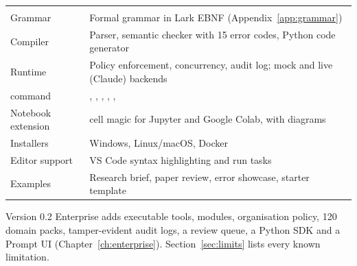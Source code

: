 \begin{center}
\small
\begin{tabularx}{\linewidth}{@{}L{4.2cm}Y@{}}
\toprule
{} & \\
\goldrule
Grammar & Formal grammar in Lark EBNF (Appendix~\ref{app:grammar})\\
Compiler  & Parser, semantic checker with 15 error codes, Python code generator\\
Runtime  & Policy enforcement, concurrency, audit log; mock and live (Claude) backends\\
 command & , , , , , \\
Notebook extension &  cell magic for Jupyter and Google Colab, with diagrams\\
Installers & Windows, Linux/macOS, Docker\\
Editor support & VS Code syntax highlighting and run tasks\\
Examples & Research brief, paper review, error showcase, starter template\\
\bottomrule
\end{tabularx}
\end{center}

\begin{caution}
Version 0.2 Enterprise adds executable tools, modules, organisation policy, 120 domain packs, tamper-evident audit logs, a review queue, a Python SDK and a Prompt UI (Chapter~\ref{ch:enterprise}). Section~\ref{sec:limits} lists every known limitation.
\end{caution}
